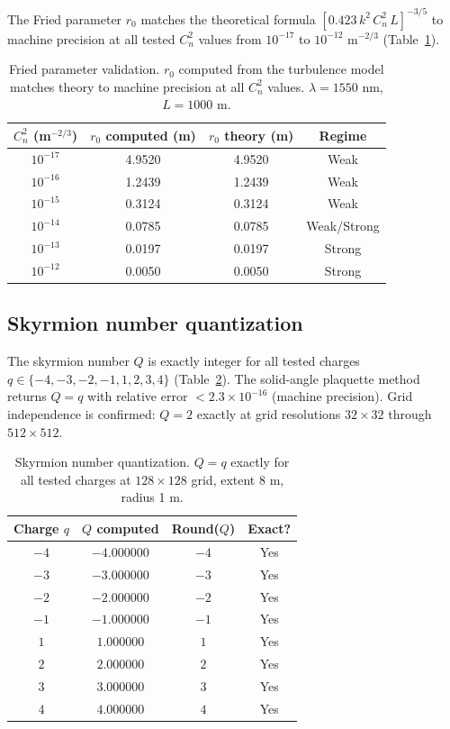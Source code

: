 \documentclass[11pt]{article}
\begin{document}
The Fried parameter $r_0$ matches the theoretical formula
$[0.423\, k^2\, C_n^2\, L]^{-3/5}$ to machine precision at all tested
$C_n^2$ values from $10^{-17}$ to $10^{-12}$ m$^{-2/3}$ (Table~\ref{tab:fried}).

\begin{table}[h]
\centering
\caption{Fried parameter validation. $r_0$ computed from the turbulence
model matches theory to machine precision at all $C_n^2$ values.
$\lambda = 1550$ nm, $L = 1000$ m.}
\label{tab:fried}
\begin{tabular}{cccc}
\toprule
$C_n^2$ (m$^{-2/3}$) & $r_0$ computed (m) & $r_0$ theory (m) & Regime \\
\midrule
$10^{-17}$ & 4.9520 & 4.9520 & Weak \\
$10^{-16}$ & 1.2439 & 1.2439 & Weak \\
$10^{-15}$ & 0.3124 & 0.3124 & Weak \\
$10^{-14}$ & 0.0785 & 0.0785 & Weak/Strong \\
$10^{-13}$ & 0.0197 & 0.0197 & Strong \\
$10^{-12}$ & 0.0050 & 0.0050 & Strong \\
\bottomrule
\end{tabular}
\end{table}

\subsection{Skyrmion number quantization}

The skyrmion number $Q$ is exactly integer for all tested charges
$q \in \{-4,-3,-2,-1,1,2,3,4\}$ (Table~\ref{tab:q}). The solid-angle
plaquette method returns $Q = q$ with relative error $< 2.3\times 10^{-16}$
(machine precision). Grid independence is confirmed: $Q = 2$ exactly at
grid resolutions $32 \times 32$ through $512 \times 512$.

\begin{table}[h]
\centering
\caption{Skyrmion number quantization. $Q = q$ exactly for all tested
charges at $128 \times 128$ grid, extent 8 m, radius 1 m.}
\label{tab:q}
\begin{tabular}{cccc}
\toprule
Charge $q$ & $Q$ computed & Round($Q$) & Exact? \\
\midrule
$-4$ & $-4.000000$ & $-4$ & Yes \\
$-3$ & $-3.000000$ & $-3$ & Yes \\
$-2$ & $-2.000000$ & $-2$ & Yes \\
$-1$ & $-1.000000$ & $-1$ & Yes \\
$1$ & $1.000000$ & $1$ & Yes \\
$2$ & $2.000000$ & $2$ & Yes \\
$3$ & $3.000000$ & $3$ & Yes \\
$4$ & $4.000000$ & $4$ & Yes \\
\bottomrule
\end{tabular}
\end{table}
\end{document}
